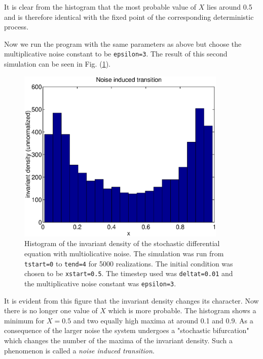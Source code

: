 It is clear from the histogram that the most probable value of $X$ 
lies around 0.5 and is therefore identical with the fixed point of 
the corresponding deterministic process.

Now we run the program with the same parameters as above but 
choose the multiplicative noise constant to be \texttt{epsilon=3}.
The result of this second simulation can be seen in Fig. 
(\ref{F_SDENOISEIN_2}).
\begin{figure}
\label{F_SDENOISEIN_2}
\includegraphics[width=10cm]{./Figures/f_sdenoisein_2.eps}
\caption{Histogram of the invariant density of the stochastic differential 
equation with multiolicative noise. The simulation was run from
\texttt{tstart=0} to \texttt{tend=4} for 5000 realizations.
The initial condition was chosen to be \texttt{xstart=0.5}.
The timestep used was \texttt{deltat=0.01} and the multiplicative noise 
constant was \texttt{epsilon=3}.} 
\end{figure}
It is evident from this figure that the invariant density changes 
its character. Now there is no longer one value of $X$ which is 
more probable. The histogram shows a minimum for $X=0.5$ and two 
equally high maxima at around 0.1 and 0.9. As a consequence of 
the larger noise the system undergoes a "stochastic bifurcation" 
which changes the number of the maxima of the invariant density. 
Such a phenomenon is called a {\em noise induced transition}.

